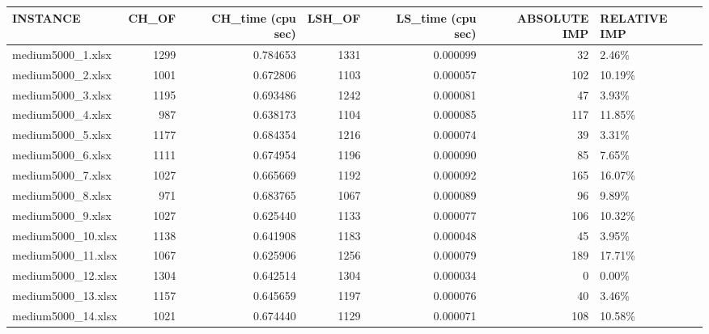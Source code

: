 \documentclass[11pt, a4paper]{article}
\begin{document}
\begin{table}[h!]
	\centering
	\begin{adjustbox}{max width=\textwidth}
	\begin{tabular}{lrrrrrl}
		\toprule
				   INSTANCE &  CH\_OF &  CH\_time (cpu sec) &  LSH\_OF &  LS\_time (cpu sec) &  ABSOLUTE IMP & RELATIVE IMP \\
		\midrule
		  medium5000\_1.xlsx &   1299 &           0.784653 &    1331 &           0.000099 &            32 &        2.46\% \\
		  medium5000\_2.xlsx &   1001 &           0.672806 &    1103 &           0.000057 &           102 &       10.19\% \\
		  medium5000\_3.xlsx &   1195 &           0.693486 &    1242 &           0.000081 &            47 &        3.93\% \\
		  medium5000\_4.xlsx &    987 &           0.638173 &    1104 &           0.000085 &           117 &       11.85\% \\
		  medium5000\_5.xlsx &   1177 &           0.684354 &    1216 &           0.000074 &            39 &        3.31\% \\
		  medium5000\_6.xlsx &   1111 &           0.674954 &    1196 &           0.000090 &            85 &        7.65\% \\
		  medium5000\_7.xlsx &   1027 &           0.665669 &    1192 &           0.000092 &           165 &       16.07\% \\
		  medium5000\_8.xlsx &    971 &           0.683765 &    1067 &           0.000089 &            96 &        9.89\% \\
		  medium5000\_9.xlsx &   1027 &           0.625440 &    1133 &           0.000077 &           106 &       10.32\% \\
		 medium5000\_10.xlsx &   1138 &           0.641908 &    1183 &           0.000048 &            45 &        3.95\% \\
		 medium5000\_11.xlsx &   1067 &           0.625906 &    1256 &           0.000079 &           189 &       17.71\% \\
		 medium5000\_12.xlsx &   1304 &           0.642514 &    1304 &           0.000034 &             0 &        0.00\% \\
		 medium5000\_13.xlsx &   1157 &           0.645659 &    1197 &           0.000076 &            40 &        3.46\% \\
		 medium5000\_14.xlsx &   1021 &           0.674440 &    1129 &           0.000071 &           108 &       10.58\% \\

\end{tabular}
\end{adjustbox}
\end{table}
\end{document}
